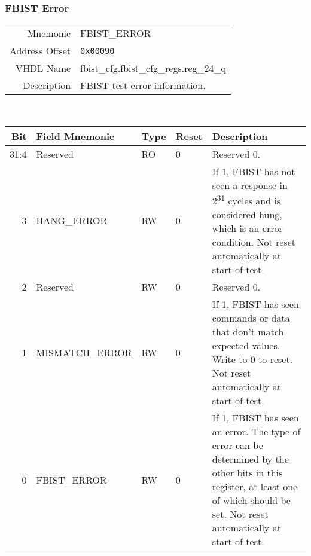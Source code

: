 \subsubsection{FBIST Error}
\begin{tabular}{ r | p{350px} }
  Mnemonic       & FBIST\_ERROR                            \\
  Address Offset & \texttt{0x00090}                        \\
  VHDL Name      &  fbist\_cfg.fbist\_cfg\_regs.reg\_24\_q \\ \hline

  Description &
  FBIST test error information. \\
\end{tabular}
\\
\begin{tabularx}{\textwidth}{r|l|l|l|X}
  \hline
  Bit   & Field Mnemonic  & Type & Reset & Description \\ \hline

  31:4  & Reserved        & RO   & 0     &

  Reserved 0. \\

  3     & HANG\_ERROR     & RW   & 0     &

  If 1, FBIST has not seen a response in 2\textsuperscript{31} cycles and is
  considered hung, which is an error condition. Not reset
  automatically at start of test. \\

  2     & Reserved        & RW  & 0     &

  Reserved 0. \\

  1     & MISMATCH\_ERROR & RW   & 0     &

  If 1, FBIST has seen commands or data that don't match expected
  values. Write to 0 to reset. Not reset automatically at start of
  test. \\

  0     & FBIST\_ERROR    & RW   & 0     &

  If 1, FBIST has seen an error. The type of error can be determined
  by the other bits in this register, at least one of which should be
  set. Not reset automatically at start of test. \\
\end{tabularx}

